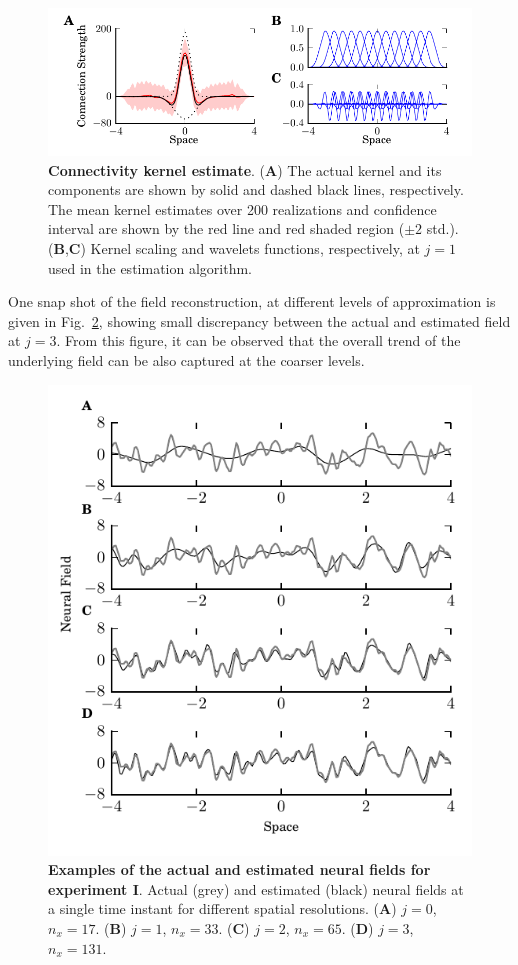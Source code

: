 \documentclass[review,authoryear,3p]{elsarticle}
\begin{document}
\begin{figure}[!t]  
 \centering
\includegraphics{./Graph/fig9.pdf}
\caption{ {\bf Connectivity kernel estimate}. (\textbf{A}) The actual kernel and its components are shown by solid and dashed black lines, respectively. The mean kernel estimates over 200 realizations and confidence interval are shown by the red line and red shaded region ($\pm2$ std.). (\textbf{B},\textbf{C}) Kernel scaling and wavelets functions, respectively, at $j=1$ used in the estimation algorithm.}
\label{fig:KernelEstimate}
\end{figure}
 One snap shot of the field reconstruction, at different levels of approximation is given in Fig.~\ref{fig:FieldEstimates100}, showing small discrepancy between the actual and estimated field at $j=3$. From this figure, it can be observed that the overall trend of the underlying field can be also captured at the coarser levels.
\begin{figure}[!t]
\centering
\includegraphics{./Graph/fig10.pdf}
\caption{ {\bf Examples of the actual and estimated neural fields for experiment I}. Actual (grey) and estimated (black) neural fields at a single time instant for different spatial resolutions. (\textbf{A}) $j=0$, $n_x=17$. (\textbf{B}) $j=1$, $n_x=33$. (\textbf{C}) $j=2$, $n_x=65$. (\textbf{D}) $j=3$, $n_x=131$.}
\label{fig:FieldEstimates100}
\end{figure}
\end{document}
